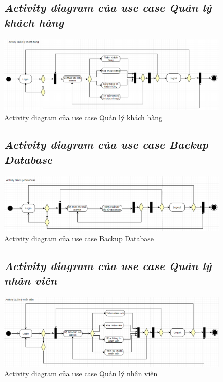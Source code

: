 \documentclass{report}
\begin{document}
\begin{figure}[htp]
    \subsection{\textit{Activity diagram của use case Quản lý khách hàng}}
    \centering
    \includegraphics[scale = 0.55]{image/activity_qlkh.PNG}
    \caption{Activity diagram của use case Quản lý khách hàng}
\end{figure}

\begin{figure}[htp]
    \subsection{\textit{Activity diagram của use case Backup Database}}
    \centering
    \includegraphics[scale = 0.6]{image/activity_backupDB.PNG}
    \caption{Activity diagram của use case Backup Database}
\end{figure}

\begin{figure}[htp]
    \subsection{\textit{Activity diagram của use case Quản lý nhân viên}}
    \centering
    \includegraphics[scale = 0.55]{image/activity_qlnv.PNG}
    \caption{Activity diagram của use case Quản lý nhân viên}
\end{figure}
\end{document}
